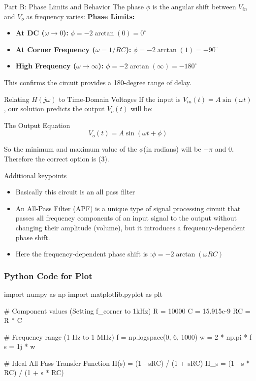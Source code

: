 \documentclass{beamer}
\begin{document}
\begin{frame}{Part B: Phase Limits and Behavior}
    The phase $\phi$ is the angular shift between $V_{in}$ and $V_o$ as frequency varies:
    \vfill
    \textbf{Phase Limits:}
    \begin{itemize}
        \item \textbf{At DC ($\omega \to 0$):} $\phi = -2\arctan(0) = 0^\circ$
        \item \textbf{At Corner Frequency ($\omega = 1/RC$):} $\phi = -2\arctan(1) = -90^\circ$
        \item \textbf{High Frequency ($\omega \to \infty$):} $\phi = -2\arctan(\infty) = -180^\circ$
    \end{itemize}
    \vfill
    This confirms the circuit provides a 180-degree range of delay.
\end{frame}

\begin{frame}{Relating $H(j\omega)$ to Time-Domain Voltages}
    If the input is $V_{in}(t) = A \sin(\omega t)$, our solution predicts the output $V_o(t)$ will be:
    \vfill
    \begin{block}{The Output Equation}
        \[ V_o(t) = A \sin(\omega t + \phi) \]
    \end{block}
    \vfill
So the minimum and maximum value of the $\phi$(in radians) will be $-\pi$ and 0.\\
Therefore the correct option is (3).
\end{frame}
\begin{frame}{Additional keypoints}
\begin{itemize}
    \item Basically this circuit is an all pass filter
    \item An All-Pass Filter (APF) is a unique type of signal processing circuit that passes all frequency components of an input signal to the output without changing their amplitude (volume), but it introduces a frequency-dependent phase shift.
    \item Here the frequency-dependent phase shift is :$\phi = -2\arctan(\omega RC)$
\end{itemize}
\end{frame}
\begin{frame}[fragile]
\frametitle{Python Code for Plot}

\begin{mycode}
import numpy as np
import matplotlib.pyplot as plt

# Component values (Setting f_corner to 1kHz)
R = 10000      
C = 15.915e-9  
RC = R * C

# Frequency range (1 Hz to 1 MHz)
f = np.logspace(0, 6, 1000)
w = 2 * np.pi * f
s = 1j * w

# Ideal All-Pass Transfer Function H(s) = (1 - sRC) / (1 + sRC)
H_s = (1 - s * RC) / (1 + s * RC)


\end{mycode}

\end{frame}
\end{document}
